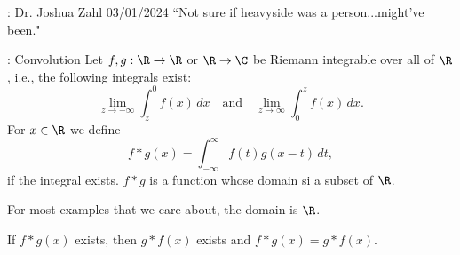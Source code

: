 \begin{nquote}{: Dr. Joshua Zahl 03/01/2024}
	``Not sure if heavyside was a person...might've been."
\end{nquote}

\begin{ndef}{: Convolution}
	Let \(f,g:\R\to\R\) or \(\R\to\C\) be Riemann integrable over all of \(\R\), i.e., the following integrals exist:
	\begin{equation*}
		\lim_{z\to -\infty}\int_z^0 f(x) \, dx\quad \text{and}\quad\lim_{z\to \infty}\int_0^z f(x) \, dx.
	\end{equation*}
	For \(x\in\R\) we define
	\begin{equation*}
		f\ast g(x)=\int_{-\infty}^{\infty}f(t)g(x-t) \, dt,
	\end{equation*}
	if the integral exists. \(f\ast g\) is a function whose domain si a subset of \(\R\).
\end{ndef}
\begin{note}
	For most examples that we care about, the domain is \(\R\).
\end{note}
\begin{exercise}
	If \(f\ast g(x)\) exists, then \(g\ast f(x)\) exists and \(f\ast g(x)=g\ast f(x)\).
\end{exercise}

